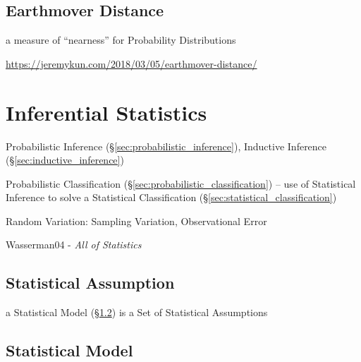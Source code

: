 \subsection{Earthmover Distance}\label{sec:earthmover_distance}


a measure of ``nearness'' for Probability Distributions

\url{https://jeremykun.com/2018/03/05/earthmover-distance/}



\section{Inferential Statistics}\label{sec:inferential_statistics}

Probabilistic Inference
(\S\ref{sec:probabilistic_inference}), Inductive Inference
(\S\ref{sec:inductive_inference})

Probabilistic Classification (\S\ref{sec:probabilistic_classification}) -- use
of Statistical Inference to solve a Statistical Classification
(\S\ref{sec:statistical_classification})

Random Variation: Sampling Variation, Observational Error

Wasserman04 - \emph{All of Statistics}



\subsection{Statistical Assumption}\label{sec:statistical_assumption}

a Statistical Model (\S\ref{sec:statistical_model}) is a Set of Statistical
Assumptions



\subsection{Statistical Model}\label{sec:statistical_model}

